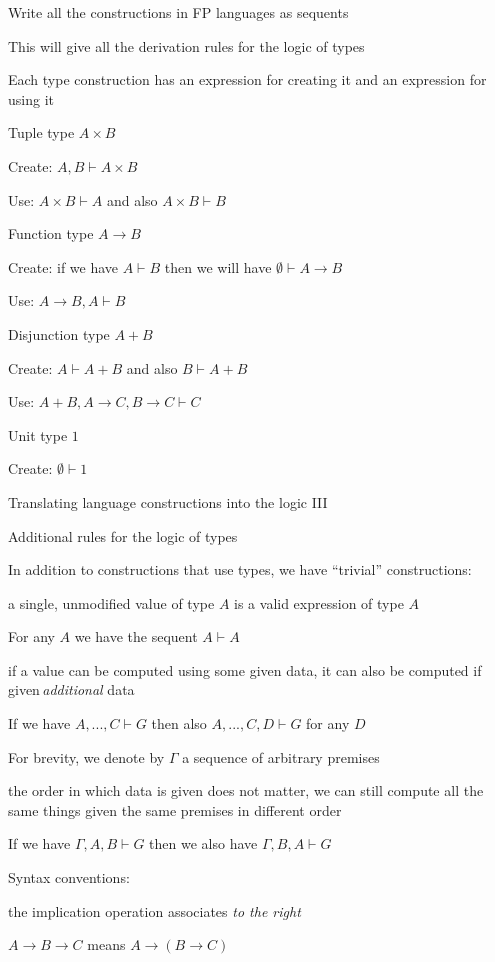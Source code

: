 Write all the constructions in FP languages as sequents

This will give all the derivation rules for the logic of types

Each type construction has an expression for creating it and an expression
for using it

Tuple type $A\times B$

Create: $A,B\vdash A\times B$ 

Use: $A\times B\vdash A$ and also $A\times B\vdash B$

Function type $A\rightarrow B$

Create: if we have $A\vdash B$ then we will have $\emptyset\vdash A\rightarrow B$ 

Use: $A\rightarrow B,A\vdash B$

Disjunction type $A+B$

Create: $A\vdash A+B$ and also $B\vdash A+B$

Use: $A+B,A\rightarrow C,B\rightarrow C\vdash C$

Unit type $1$

Create: $\emptyset\vdash1$

Translating language constructions into the logic III

Additional rules for the logic of types

In addition to constructions that use types, we have \textsf{``}trivial\textsf{''}
constructions:

a single, unmodified value of type $A$ is a valid expression of type
$A$

For any $A$ we have the sequent $A\vdash A$

if a value can be computed using some given data, it can also be computed
if given\,\emph{additional} data

If we have $A,...,C\vdash G$ then also $A,...,C,D\vdash G$ for any
$D$

For brevity, we denote by $\Gamma$ a sequence of arbitrary premises

the order in which data is given does not matter, we can still compute
all the same things given the same premises in different order

If we have $\Gamma,A,B\vdash G$ then we also have $\Gamma,B,A\vdash G$

Syntax conventions:

the implication operation associates \emph{to the right}

$A\rightarrow B\rightarrow C$ means $A\rightarrow\left(B\rightarrow C\right)$

